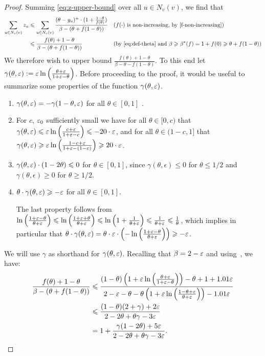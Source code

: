 \begin{proof}
Summing \eqref{eq:z-upper-bound} over all $u\in N_v(v)$, we find that
	\begin{align*}
	\sum_{u\in N_v(v)} z_u& 
	\leq \sum_{u\in N_v(v)}\frac{(\theta-y_u)^+\cdot (1+\frac{1-\theta}{f(\theta)})}{\beta-(\theta+f(1-\theta))}&& \text{($f(\cdot)$ is non-increasing, by~\Cref{f-non-increasing})}\\
	&\leq \frac{f(\theta)+1-\theta}{\beta-(\theta+f(1-\theta))} && \text{(by \eqref{eq:def-theta} and $\beta\geq \beta^*(f) = 1+f(0) \geq \theta+f(1-\theta)$)}
	\end{align*}
We therefore wish to upper bound $\frac{f(\theta) + 1-\theta}{\beta - \theta - f(1-\theta)}$. To this end let $\gamma(\theta, \varepsilon) :=\varepsilon \ln \left(\frac{\theta+\varepsilon}{1+\varepsilon-\theta}\right)$. Before proceeding to the proof, it would be useful to summarize some properties of the function $\gamma(\theta, \varepsilon)$. 
\begin{enumerate}
\item $ \gamma(\theta, \varepsilon) = - \gamma(1-\theta, \varepsilon) $ for all $\theta \in [0,1]$ \label{gamma:property4}.
\item For $c$, $\varepsilon_0$ sufficiently small we have
for all $\theta \in [0,c)$ that $\gamma(\theta,\varepsilon) \leqslant \varepsilon \ln \left(\frac{c+\varepsilon}{1+\varepsilon-c}\right) \leqslant -20\cdot \varepsilon$, and
 for all $\theta \in (1-c,1]$ that $ \gamma(\theta, \varepsilon) \geqslant \varepsilon \ln \left(\frac{1-c+\varepsilon}{1+\varepsilon-(1-c)}\right) \geqslant 20\cdot \varepsilon$. \label{gamma:property1}
\item $\gamma (\theta, \varepsilon)\cdot (1 - 2 \theta) \leqslant 0$ for $\theta \in [0,1]$, since $\gamma(\theta,\epsilon)\leq 0$ for $\theta\leq 1/2$ and $\gamma(\theta,\epsilon)\geq 0$ for $\theta \geq 1/2$.
 \label{gamma:property2}
\item $\theta \cdot  \gamma (\theta, \varepsilon)  \geqslant -\varepsilon$ for all $\theta \in [0,1]$. \label{gamma:property3}

The last property follows from $ \ln \left(\frac{1+\varepsilon-\theta}{\theta+\varepsilon}  \right) \leqslant \ln \left(\frac{1+\varepsilon+\theta}{\theta+\varepsilon}  \right) \leqslant \ln \left(1 + \frac{1}{\theta+\varepsilon}  \right) \leqslant \frac{1}{\theta + \varepsilon}  \leqslant \frac{1}{\theta}$, which implies in particular that $\theta \cdot \gamma(\theta, \varepsilon) =  \theta \cdot \varepsilon \cdot \left(- \ln \left( \frac{1+\varepsilon-\theta}{\theta + \varepsilon}\right) \right)  \geqslant -\varepsilon$.
\end{enumerate}

We will use $\gamma$ as shorthand for  $\gamma(\theta, \varepsilon)$.  Recalling that $\beta=2-\varepsilon$ and using~,  we have:
	\begin{equation}\label{eq:2isdighg}
	\begin{split}
	\frac{f(\theta)+1-\theta}{\beta-(\theta+f(1-\theta))}&\leqslant \frac{(1-\theta)\left(1+\varepsilon \ln \left(\frac{\theta+\varepsilon}{1+\varepsilon-\theta}\right)\right)-\theta+1+1.01\varepsilon}{2-\varepsilon - \theta-\theta\left(1+\varepsilon \ln \left(\frac{1-\theta+\varepsilon}{\theta+\varepsilon}\right)\right)-1.01\varepsilon}\\	
	& \leqslant \frac{(1-\theta)(2+\gamma)+2\varepsilon}{2-2\theta+\theta \gamma-3\varepsilon}\\
	& =	1+\frac{\gamma(1-2\theta)+5\varepsilon}{2-2\theta+\theta\gamma-3\varepsilon}.
\end{split}
\end{equation} 


\end{proof}
